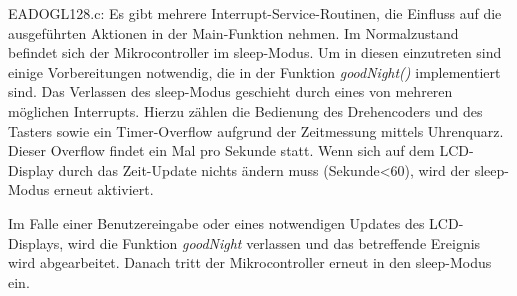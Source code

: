 \documentclass[journal, a4paper]{IEEEtran}
\begin{document}
	EADOGL128.c:
	Es gibt mehrere Interrupt-Service-Routinen, die Einfluss auf die ausgeführten Aktionen in der Main-Funktion nehmen. Im Normalzustand befindet sich der Mikrocontroller im sleep-Modus. Um in diesen einzutreten sind einige Vorbereitungen notwendig, die in der Funktion \emph{goodNight()} implementiert sind. Das Verlassen des sleep-Modus geschieht durch eines von mehreren möglichen Interrupts. Hierzu zählen die Bedienung des Drehencoders und des Tasters sowie ein Timer-Overflow aufgrund der Zeitmessung mittels Uhrenquarz. Dieser Overflow findet ein Mal pro Sekunde statt. Wenn sich auf dem LCD-Display durch das Zeit-Update nichts ändern muss (Sekunde<60), wird der sleep-Modus erneut aktiviert. \par
	Im Falle einer Benutzereingabe oder eines notwendigen Updates des LCD-Displays, wird die Funktion \emph{goodNight} verlassen und das betreffende Ereignis wird abgearbeitet. Danach tritt der Mikrocontroller erneut in den sleep-Modus ein.
	
\end{document}
